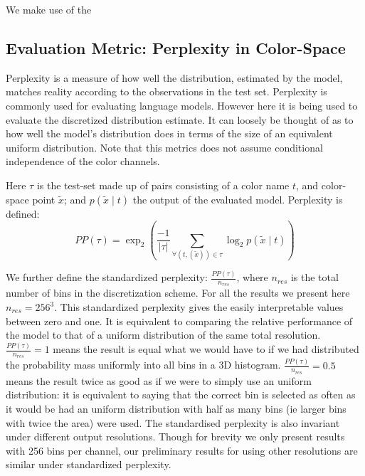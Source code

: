 \documentclass[11pt,a4paper]{article}
\newcommand{\textcite}{\citet}
\begin{document}
We make use of the \textcite{silverman1982algorithm}


\subsection{Evaluation Metric: Perplexity in Color-Space}
Perplexity is a measure of how well the distribution, estimated by the model, matches reality according to the observations in the test set.
Perplexity is commonly used for evaluating language models. However here it is being used to evaluate the discretized distribution estimate.
It can loosely be thought of as to how well the model's distribution does in terms of the size of an equivalent uniform distribution.
Note that this metrics does not assume conditional independence of the color channels.

Here $\tau$ is the test-set made up of pairs consisting of a color name $t$, and color-space point $\tilde{x}$;
and  $p(\tilde{x}\mid t)$  the output of the evaluated model.
Perplexity is defined:
\begin{equation}
PP(\tau) = \exp_2{\left(
	\frac{-1}{|\tau|} 
	\sum_{
		\forall(t,(\tilde{x})) \in \tau}
	\log_2 p(\tilde{x}\mid t)\right)}
\end{equation}

We further define the standardized perplexity: $\frac{PP(\tau)}{n_{res}}$,
where $n_{res}$ is the total number of bins in the discretization scheme.
For all the results we present here $n_{res} = 256^3$.
This standardized perplexity gives the easily interpretable values between zero and one.
It is equivalent to comparing the relative performance of the model to that of a uniform distribution of the same total resolution.
$\frac{PP(\tau)}{n_{res}}=1$ means the result is equal what we would have to if we had distributed the probability mass uniformly into all bins in a 3D histogram.
$\frac{PP(\tau)}{n_{res}}=0.5$ means the result twice as good as if we were to simply use an uniform distribution: it is equivalent to saying that the correct bin is selected as often as it would be had an uniform distribution with half as many bins (ie larger bins with twice the area) were used.
The standardised perplexity is also invariant under different output resolutions.
Though for brevity we only  present results with 256 bins per channel, our preliminary results for using other resolutions are similar under standardized perplexity.
\end{document}
